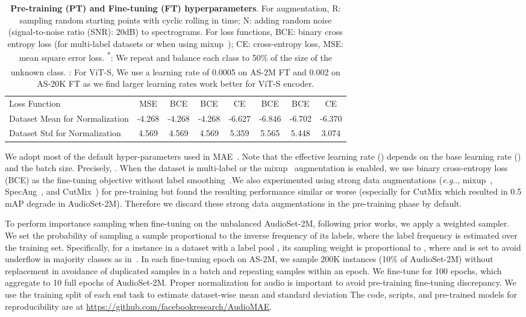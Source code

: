 \documentclass{article}
\makeatletter
\DeclareRobustCommand\onedot{\futurelet\@let@token\@onedot}
\def\@onedot{\ifx\@let@token.\else.\null\fi\xspace}
\def\eg{\emph{e.g}\onedot} \def\Eg{\emph{E.g}\onedot}
\makeatother
\begin{document}
\begin{table*}[t]
\begin{tabular}{l|c|cccccc}
        Loss Function & MSE & BCE & BCE & CE & BCE & BCE & CE \\
        Dataset Mean for Normalization & -4.268 & -4.268 & -4.268 & -6.627 & -6.846 & -6.702 & -6.370 \\
        Dataset Std for Normalization & 4.569 & 4.569 & 4.569 & 5.359 & 5.565 & 5.448 & 3.074 \\
    \end{tabular}
    \caption{\textbf{Pre-training (PT) and Fine-tuning (FT) hyperparameters}. For augmentation, R: sampling random starting points with cyclic rolling in time; N: adding random noise (signal-to-noise ratio (SNR): 20dB) to spectrograms. For loss functions, BCE: binary cross entropy loss (for multi-label datasets or when using mixup~\cite{mixup}); CE: cross-entropy loss, MSE: mean square error loss.
    \textsuperscript{*}: We repeat and balance each class to 50\% of the size of the unknown class.    
    \textsuperscript{}: For ViT-S, We use a learning rate of 0.0005 on AS-2M FT and 0.002 on AS-20K FT as we find larger learning rates work better for ViT-S encoder.
    \label{tab:app:train}}
    \vspace{-1em}
\end{table*}


We adopt most of the default hyper-parameters used in MAE~\cite{mae}.
Note that the effective learning rate () depends on the base learning rate () and the batch size. Precisely, .
When the dataset is multi-label or the mixup~\cite{mixup} augmentation is enabled, we use binary cross-entropy loss (BCE) as the fine-tuning objective without label smoothing~\cite{smoothing}.We also experimented using strong data augmentations (\eg, mixup~\cite{mixup}, SpecAug~\cite{mixup}, and CutMix~\cite{cutmix}) for pre-training but found the resulting performance similar or worse (especially for CutMix which resulted in 0.5 mAP degrade in AudioSet-2M). Therefore we discard these strong data augmentations in the pre-training phase by default.

To perform importance sampling when fine-tuning on the unbalanced AudioSet-2M, 
following prior works, we apply a weighted sampler. 
We set the probability of sampling a sample proportional to the inverse frequency of its labels, where the label frequency is estimated over the training set. Specifically, for a instance  in a dataset  with a label pool , its sampling weight is proportional to , where  and  is set to avoid underflow in majority classes as in~\cite{gong2021ast}.
In each fine-tuning epoch on AS-2M, we sample 200K instances (10\% of AudioSet-2M) without replacement in avoidance of duplicated samples in a batch and repeating samples within an epoch.
We fine-tune for 100 epochs, which aggregate to 10 full epochs of AudioSet-2M.
Proper normalization for audio is important to avoid pre-training fine-tuning discrepancy. We use the training split of each end task to estimate dataset-wise mean and standard deviation 
The code, scripts, and pre-trained models for reproducibility are at \url{https://github.com/facebookresearch/AudioMAE}.
\end{document}
